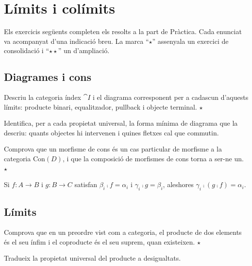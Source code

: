 \chapter[Límits i colímits]{Límits i colímits}

Els exercicis següents completen els resolts a la part de Pràctica. Cada enunciat va acompanyat d'una indicació breu. La marca \enquote{$\star$} assenyala un exercici de consolidació i \enquote{$\star\star$} un d'ampliació.

\section{Diagrames i cons}

\begin{exercici}
Descriu la categoria índex $\cat{I}$ i el diagrama corresponent per a cadascun d'aquests límits: producte binari, equalitzador, pullback i objecte terminal. \hfill{\normalfont$\star$}
\begin{indicacio}
Identifica, per a cada propietat universal, la forma mínima de diagrama que la descriu: quants objectes hi intervenen i quines fletxes cal que commutin.
\end{indicacio}
\end{exercici}

\begin{exercici}
Comprova que un morfisme de cons és un cas particular de morfisme a la categoria $\mathrm{Con}(D)$, i que la composició de morfismes de cons torna a ser-ne un. \hfill{\normalfont$\star$}
\begin{indicacio}
Si $f\colon A\to B$ i $g\colon B\to C$ satisfan $\beta_i\comp f=\alpha_i$ i $\gamma_i\comp g=\beta_i$, aleshores $\gamma_i\comp(g\comp f)=\alpha_i$.
\end{indicacio}
\end{exercici}

\section{Límits}

\begin{exercici}
Comprova que en un preordre vist com a categoria, el producte de dos elements és el seu ínfim i el coproducte és el seu suprem, quan existeixen. \hfill{\normalfont$\star$}
\begin{indicacio}
Tradueix la propietat universal del producte a desigualtats.
\end{indicacio}
\end{exercici}

